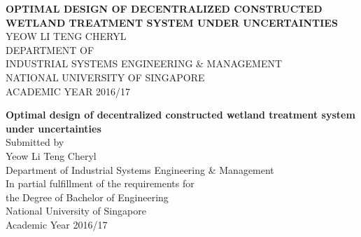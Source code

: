 \documentclass[preprint,12pt,authoryear]{elsarticle}
\begin{document}
\setlength{\abovedisplayskip}{3pt}
\setlength{\belowdisplayskip}{3pt}
\begin{titlepage}
    \begin{center}
        \vspace*{1cm}
        
        \Huge
	 \uppercase{\textbf{Optimal design of decentralized constructed wetland treatment system under uncertainties}}\\        
	 \noindent\makebox[\linewidth]{\rule{0.7\paperwidth}{0.4pt}}
        \vspace{0.5cm}
        \Large
        \uppercase{Yeow Li Teng Cheryl}\\        
        \vfill        
        \Large
        \uppercase{Department of \\Industrial Systems Engineering \& Management \\
        National University of Singapore\\
	  Academic Year 2016/17}
        
    \end{center}
\end{titlepage}


\begin{titlepage}
    \begin{center}
        \vspace*{1cm}
        
        \Huge
	 \textbf{Optimal design of decentralized constructed wetland treatment system under uncertainties}\\        
	 \noindent\makebox[\linewidth]{\rule{0.7\paperwidth}{0.4pt}}
        \vspace{0.5cm}
        \Large
	  Submitted by\\
        Yeow Li Teng Cheryl\\        
        \vspace{1.5cm}
	  Department of Industrial Systems Engineering \& Management\\
        \vfill        
        \large
        In partial fulfillment of the requirements for \\
	  the Degree of Bachelor of Engineering\\
        National University of Singapore\\
	  Academic Year 2016/17
        
    \end{center}
\end{titlepage}
\end{document}
